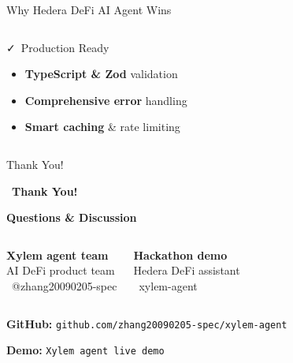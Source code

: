 \documentclass[aspectratio=169]{beamer}
\providecommand{\faCheckDouble}{\faCheck}
\begin{document}
\begin{frame}{Why Hedera DeFi AI Agent Wins}
\begin{columns}
\begin{block}{\faCheckDouble\ Production Ready}
\begin{itemize}
\item \textbf{TypeScript \& Zod} validation
\item \textbf{Comprehensive error} handling
\item \textbf{Smart caching} \& rate limiting
\end{itemize}
\end{block}
\end{columns}
\end{frame}

\begin{frame}{Thank You!}
\begin{center}
\large \faHeart\ \textbf{Thank You!}

\vspace{0.2cm}

\small \textbf{Questions \& Discussion}

\vspace{0.3cm}

\begin{columns}
\hspace{2.5cm}
\textbf{\footnotesize Xylem agent team}\\
\vspace{0.05cm}
\footnotesize AI DeFi product team\\
\vspace{0.05cm}
\footnotesize \faGithub\ @zhang20090205-spec

\textbf{\footnotesize Hackathon demo}\\
\vspace{0.05cm}
\footnotesize Hedera DeFi assistant\\
\vspace{0.05cm}
\footnotesize \faGithub\ xylem-agent
\end{columns}

\vspace{0.3cm}

\textbf{\footnotesize GitHub:} \hspace{0.2cm} \texttt{\footnotesize github.com/zhang20090205-spec/xylem-agent}

\vspace{0.1cm}

\textbf{\footnotesize Demo:} \texttt{\footnotesize Xylem agent live demo}
\end{center}
\end{frame}
\end{document}
